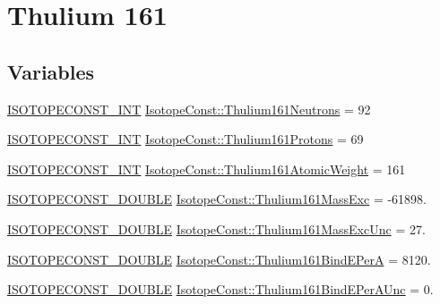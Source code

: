 \hypertarget{group___isotope_const-_thulium-_tm161}{}\section{Thulium 161}
\label{group___isotope_const-_thulium-_tm161}
\subsection*{Variables}
\begin{DoxyCompactItemize}
\item 
\mbox{\hyperlink{group___isotope_const-_macros_ga5f18360b3e99483a35c32d789e62621c}{I\+S\+O\+T\+O\+P\+E\+C\+O\+N\+S\+T\+\_\+\+I\+NT}} \mbox{\hyperlink{group___isotope_const-_thulium-_tm161_ga3b24268eadef2c029cf16b83d5e4573c}{Isotope\+Const\+::\+Thulium161\+Neutrons}} = 92
\item 
\mbox{\hyperlink{group___isotope_const-_macros_ga5f18360b3e99483a35c32d789e62621c}{I\+S\+O\+T\+O\+P\+E\+C\+O\+N\+S\+T\+\_\+\+I\+NT}} \mbox{\hyperlink{group___isotope_const-_thulium-_tm161_gaeb22cb5d3062ce9fa0f24e81f3d46e0a}{Isotope\+Const\+::\+Thulium161\+Protons}} = 69
\item 
\mbox{\hyperlink{group___isotope_const-_macros_ga5f18360b3e99483a35c32d789e62621c}{I\+S\+O\+T\+O\+P\+E\+C\+O\+N\+S\+T\+\_\+\+I\+NT}} \mbox{\hyperlink{group___isotope_const-_thulium-_tm161_gac05fd5897a5e33ba25adc55ae90738b2}{Isotope\+Const\+::\+Thulium161\+Atomic\+Weight}} = 161
\item 
\mbox{\hyperlink{group___isotope_const-_macros_ga8f45a7272ce02c0b4c65c44636ed719a}{I\+S\+O\+T\+O\+P\+E\+C\+O\+N\+S\+T\+\_\+\+D\+O\+U\+B\+LE}} \mbox{\hyperlink{group___isotope_const-_thulium-_tm161_ga3ddbafce4786298c49f8a5f80bd33d99}{Isotope\+Const\+::\+Thulium161\+Mass\+Exc}} = -\/61898.
\item 
\mbox{\hyperlink{group___isotope_const-_macros_ga8f45a7272ce02c0b4c65c44636ed719a}{I\+S\+O\+T\+O\+P\+E\+C\+O\+N\+S\+T\+\_\+\+D\+O\+U\+B\+LE}} \mbox{\hyperlink{group___isotope_const-_thulium-_tm161_ga9e9cba54789c61f8fae99813a1fa6d5a}{Isotope\+Const\+::\+Thulium161\+Mass\+Exc\+Unc}} = 27.
\item 
\mbox{\hyperlink{group___isotope_const-_macros_ga8f45a7272ce02c0b4c65c44636ed719a}{I\+S\+O\+T\+O\+P\+E\+C\+O\+N\+S\+T\+\_\+\+D\+O\+U\+B\+LE}} \mbox{\hyperlink{group___isotope_const-_thulium-_tm161_gaa497067e65ee284ece10813e076076ad}{Isotope\+Const\+::\+Thulium161\+Bind\+E\+PerA}} = 8120.
\item 
\mbox{\hyperlink{group___isotope_const-_macros_ga8f45a7272ce02c0b4c65c44636ed719a}{I\+S\+O\+T\+O\+P\+E\+C\+O\+N\+S\+T\+\_\+\+D\+O\+U\+B\+LE}} \mbox{\hyperlink{group___isotope_const-_thulium-_tm161_gac8a5f11b3c98df2d1fbc7f514dc725d2}{Isotope\+Const\+::\+Thulium161\+Bind\+E\+Per\+A\+Unc}} = 0.

\end{DoxyCompactItemize}
